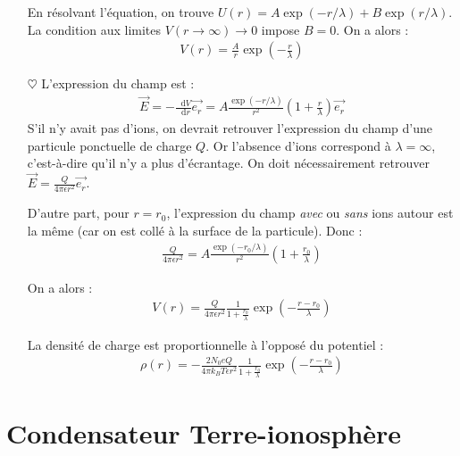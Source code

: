 \documentclass{report}
\newcommand*\dif{\mathop{}\!\mathrm{d}}
\begin{document}
\begin{itemize}
	En résolvant l'équation, on trouve $U(r)=A\exp\left(-r/\lambda \right) +B\exp\left(r/\lambda\right)$. La condition aux limites $V(r\longrightarrow\infty)\longrightarrow0$ impose $B=0$. On a alors :
	\begin{align*}
		V(r)=\frac{A}{r}\exp\left(-\frac{r}{\lambda} \right) 
	\end{align*}
	
	\item[$\heartsuit$] L'expression du champ est :
	\begin{align*}
		\vec{E}=-\frac{\dif V}{\dif r}\vec{e_r}=A\frac{\exp(-r/\lambda)}{r^2}\left(1+\frac{r}{\lambda}\right)\vec{e_r}
	\end{align*}
	S'il n'y avait pas d'ions, on devrait retrouver l'expression du champ d'une particule ponctuelle de charge $Q$. Or l'absence d'ions correspond à $\lambda=\infty$, c'est-à-dire qu'il n'y a plus d'écrantage. On doit nécessairement retrouver $\vec{E}=\frac{Q}{4\pi\epsilon r^2}\vec{e_r}$.
	
	D'autre part, pour $r=r_0$, l'expression du champ \textit{avec} ou \textit{sans} ions autour est la même (car on est collé à la surface de la particule). Donc :
	\begin{align*}
		\frac{Q}{4\pi\epsilon r^2}=A\frac{\exp(-r_0/\lambda)}{r^2}\left(1+\frac{r_0}{\lambda}\right)
	\end{align*}
	
	On a alors :
	\begin{align*}
		V(r)=\frac{Q}{4\pi\epsilon r^2}\frac{1}{1+\frac{r_0}{\lambda}}\exp\left(-\frac{r-r_0}{\lambda} \right) 
	\end{align*}
	
La densité de charge est proportionnelle à l'opposé du potentiel :
	\begin{align*}
		\rho(r)=-\frac{2N_0eQ}{4\pi k_BT\epsilon r^2}\frac{1}{1+\frac{r_0}{\lambda}}\exp\left(-\frac{r-r_0}{\lambda} \right) 
	\end{align*}	
	
\end{itemize}

\section*{Condensateur Terre-ionosphère}
\end{document}
